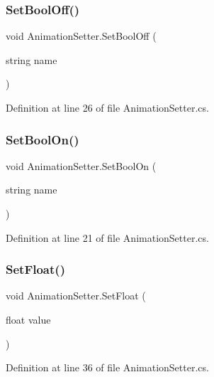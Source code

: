 \subsubsection{\texorpdfstring{Set\+Bool\+Off()}{SetBoolOff()}}
{\footnotesize\ttfamily void Animation\+Setter.\+Set\+Bool\+Off (\begin{DoxyParamCaption}\item[{string}]{name }\end{DoxyParamCaption})}



Definition at line 26 of file Animation\+Setter.\+cs.

\mbox{\label{class_animation_setter_afbd08ba6b38787063ff772eff7b18b8d}} 
\subsubsection{\texorpdfstring{Set\+Bool\+On()}{SetBoolOn()}}
{\footnotesize\ttfamily void Animation\+Setter.\+Set\+Bool\+On (\begin{DoxyParamCaption}\item[{string}]{name }\end{DoxyParamCaption})}



Definition at line 21 of file Animation\+Setter.\+cs.

\mbox{\label{class_animation_setter_abd92ef0385ccaf71233fec4ea3e2c61e}} 
\subsubsection{\texorpdfstring{Set\+Float()}{SetFloat()}}
{\footnotesize\ttfamily void Animation\+Setter.\+Set\+Float (\begin{DoxyParamCaption}\item[{float}]{value }\end{DoxyParamCaption})}



Definition at line 36 of file Animation\+Setter.\+cs.

\mbox{\label{class_animation_setter_af21491dbc13ae2314bcc45b58c45c4e2}} 
